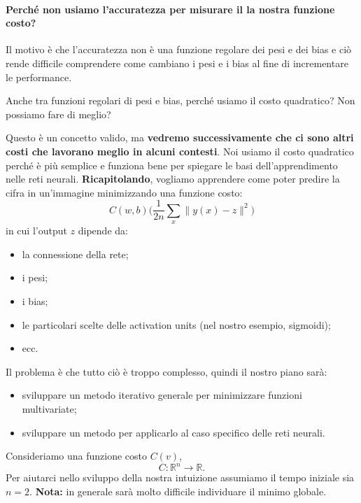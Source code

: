 \paragraph{Perché non usiamo l’accuratezza per misurare il la nostra funzione costo?} Il motivo è che l’accuratezza non è una funzione regolare dei pesi e dei bias e ciò rende difficile comprendere come cambiano i pesi e i bias al fine di incrementare le performance.


Anche tra funzioni regolari di pesi e bias, perché usiamo il costo quadratico? Non possiamo fare di meglio?


Questo è un concetto valido, ma \textbf{vedremo successivamente che ci sono altri costi che lavorano meglio in alcuni contesti}. Noi usiamo il costo quadratico perché è più semplice e funziona bene per spiegare le basi dell’apprendimento nelle reti neurali.
\newline
\newline
\textbf{Ricapitolando}, vogliamo apprendere come poter predire la cifra in un’immagine minimizzando una funzione costo:
\begin{equation}
     C(w,b)\Big( \frac{1}{2n}\sum_x \| y(x)-z \|^2 \Big)
\end{equation}
in cui l'output $z$ dipende da:
\begin{itemize}
    \item la connessione della rete;
    \item i pesi;
    \item i bias;
    \item le particolari scelte delle activation units (nel nostro esempio, sigmoidi);
    \item ecc.
\end{itemize}
Il problema è che tutto ciò è troppo complesso, quindi il nostro piano sarà:
\begin{itemize}
    \item sviluppare un metodo iterativo generale per minimizzare funzioni multivariate;
    \item sviluppare un metodo per applicarlo al caso specifico delle reti neurali.
\end{itemize}
\newpage
Consideriamo una funzione costo $C(v)$,
\begin{equation}
    C:\mathbb{R}^n\rightarrow \mathbb{R}.
\end{equation}
Per aiutarci nello sviluppo della nostra intuizione assumiamo il tempo iniziale sia $n=2$.
\textbf{Nota:} in generale sarà molto difficile individuare il minimo globale.


